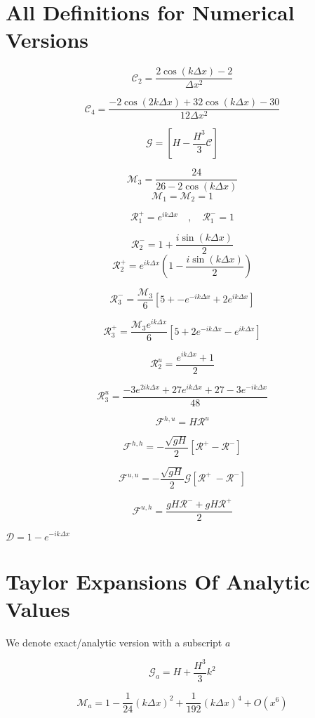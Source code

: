 \documentclass[12pt]{article}
\begin{document}
\section{All Definitions for Numerical Versions}
\[\mathcal{C}_2 = \frac{ 2\cos\left(k\Delta x\right) - 2 }{\Delta x^2}\]

\[\mathcal{C}_4 = \frac{-2\cos\left(2k\Delta x\right) + 32\cos\left(k\Delta x\right)  - 30 }{12\Delta x^2}\]

\[\mathcal{G} = \left[H -\frac{H^3}{3} \mathcal{C}\right]\]

\[\mathcal{M}_3= \frac{24}{26  -2\cos\left(k\Delta x\right)}\]
\[\mathcal{M}_1 = \mathcal{M}_2 = 1\]

\[\mathcal{R}^+_1 =  e^{ik\Delta x} \quad , \quad\mathcal{R}^-_1 =  1\]

\[\mathcal{R}_2^- = 1  + \frac{i\sin\left(k\Delta x\right)}{2}\]
\[\mathcal{R}_2^+ = e^{ik\Delta x}\left(1  - \frac{i\sin\left(k\Delta x\right)}{2} \right)\]

\[\mathcal{R}_3^-= \frac{\mathcal{M}_3}{6}\left[5 +  - e^{-ik\Delta x} + 2e^{ik\Delta x} \right]\]

\[\mathcal{R}_3^+= \frac{\mathcal{M}_3 e^{ik\Delta x }}{6}\left[5 + 2e^{-ik\Delta x} - e^{ik\Delta x} \right]\] 

\[\mathcal{R}^u_2 = \frac{e^{ik\Delta x } + 1}{2} \]

\[\mathcal{R}^u_3 = \frac{-3e^{2ik\Delta x } + 27e^{ik\Delta x } + 27 - 3e^{-ik\Delta x }}{48}\]


\[\mathcal{F}^{h,u} = H\mathcal{R}^u\]

\[\mathcal{F}^{h,h} = -\dfrac{ \sqrt{gH}}{ 2} \left [ \mathcal{R}^+- \mathcal{R}^- \right ]\]

\[\mathcal{F}^{u,u} = - \dfrac{ \sqrt{gH}}{ 2} \mathcal{G} \left [ \mathcal{R}^+ \ -  \mathcal{R}^-  \right ]\]

\[\mathcal{F}^{u,h} = \dfrac{ gH \mathcal{R}^- + gH \mathcal{R}^+}{ 2}\]


$\mathcal{D} = 1 -e^{-ik\Delta x}$

\section{Taylor Expansions Of Analytic Values }
We denote exact/analytic version with a subscript $a$

\[\mathcal{G}_a = H + \frac{H^3}{3}k^2\]

\[\mathcal{M}_a = 1 - \frac{1}{24} (k\Delta x)^2 + \frac{1}{192} (k\Delta x)^4 + O(x^{6}) \]
\end{document}
